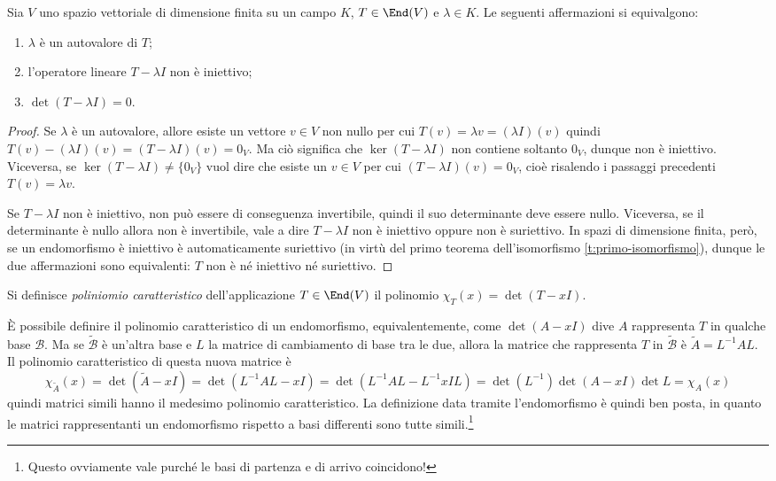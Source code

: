 \begin{teorema}\label{t:autovalore-determinante}
	Sia $V$ uno spazio vettoriale di dimensione finita su un campo $K$, $T\in\End(V)$ e $\lambda\in K$. Le seguenti affermazioni si equivalgono:
	\begin{enumerate}
		\item $\lambda$ è un autovalore di $T$;
		\item l'operatore lineare $T-\lambda I$ non è iniettivo;
		\item $\det(T-\lambda I)=0$.
	\end{enumerate}
\end{teorema}
\begin{proof}
	Se $\lambda$ è un autovalore, allore esiste un vettore $v\in V$ non nullo per cui $T(v)=\lambda v=(\lambda I)(v)$ quindi $T(v)-(\lambda I)(v)=(T-\lambda I)(v)=0_V$.
	Ma ciò significa che $\ker(T-\lambda I)$ non contiene soltanto $0_V$, dunque non è iniettivo.
	Viceversa, se $\ker(T-\lambda I)\neq\{0_V\}$ vuol dire che esiste un $v\in V$ per cui $(T-\lambda I)(v)=0_V$, cioè risalendo i passaggi precedenti $T(v)=\lambda v$.

	Se $T-\lambda I$ non è iniettivo, non può essere di conseguenza invertibile, quindi il suo determinante deve essere nullo.
	Viceversa, se il determinante è nullo allora non è invertibile, vale a dire $T-\lambda I$ non è iniettivo oppure non è suriettivo.
	In spazi di dimensione finita, però, se un endomorfismo è iniettivo è automaticamente suriettivo (in virtù del primo teorema dell'isomorfismo \ref{t:primo-isomorfismo}), dunque le due affermazioni sono equivalenti: $T$ non è n\'e iniettivo n\'e suriettivo.
\end{proof}

\begin{definizione} \label{d:polinomio-caratteristico}
	Si definisce \emph{poliniomio caratteristico} dell'applicazione $T\in\End(V)$ il polinomio $\chi_T(x)=\det(T-xI)$.
\end{definizione}
È possibile definire il polinomio caratteristico di un endomorfismo, equivalentemente, come $\det(A-xI)$ dive $A$ rappresenta $T$ in qualche base $\mathcal B$.
Ma se $\tilde{\mathcal B}$ è un'altra base e $L$ la matrice di cambiamento di base tra le due, allora la matrice che rappresenta $T$ in $\tilde{\mathcal B}$ è $\tilde{A}=L^{-1}AL$.
Il polinomio caratteristico di questa nuova matrice è
\begin{equation*}
	\chi_{\tilde{A}}(x)=\det(\tilde{A}-xI)=\det(L^{-1}AL-xI)=\det(L^{-1}AL-L^{-1}xIL)=\det(L^{-1})\det(A-xI)\det L=\chi_A(x)
\end{equation*}
quindi matrici simili hanno il medesimo polinomio caratteristico.
La definizione data tramite l'endomorfismo è quindi ben posta, in quanto le matrici rappresentanti un endomorfismo rispetto a basi differenti sono tutte simili.\footnote{Questo ovviamente vale purch\'e le basi di partenza e di arrivo coincidono!}

